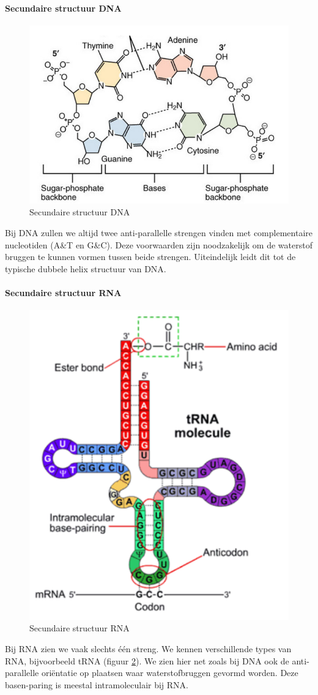 \documentclass[a4paper,kul]{kulakarticle} %
\begin{document}
\paragraph{Secundaire structuur DNA}
\begin{figure}[h]
	\centering
	\includegraphics[width=0.5\linewidth]{SecundaireStructuurDNA}
	\caption[Secundaire structuur DNA]{Secundaire structuur DNA}
	\label{fig:secundairestructuurdna}
\end{figure}
Bij DNA zullen we altijd twee anti-parallelle strengen vinden met complementaire nucleotiden (A\&T en G\&C). Deze voorwaarden zijn noodzakelijk om de waterstof bruggen te kunnen vormen tussen beide strengen. Uiteindelijk leidt dit tot de typische dubbele helix structuur van DNA. 

\paragraph{Secundaire structuur RNA}
\begin{figure}[h]
	\centering
	\includegraphics[width=0.5\linewidth]{SecundaireStructuurRNA}
	\caption[Secundaire structuur RNA]{Secundaire structuur RNA}
	\label{fig:secundairestructuurrna}
\end{figure}
Bij RNA zien we vaak slechts één streng. We kennen verschillende types van RNA, bijvoorbeeld tRNA (figuur \ref{fig:secundairestructuurrna}). We zien hier net zoals bij DNA ook de anti-parallelle oriëntatie op plaatsen waar waterstofbruggen gevormd worden. Deze basen-paring is meestal intramoleculair bij RNA. 
\newpage
\end{document}
